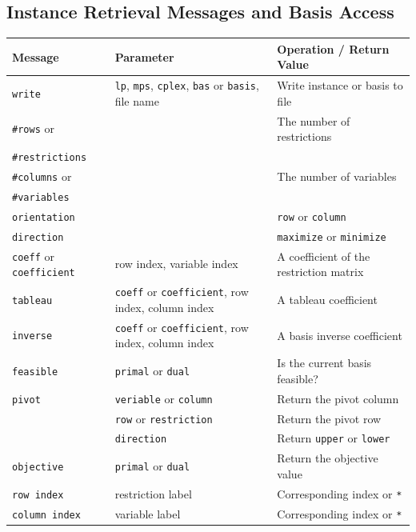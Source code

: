 \documentclass[a4paper,11pt,twoside]{book}
\begin{document}
\subsection{Instance Retrieval Messages and Basis Access}
\medskip
\begin{center}
\begin{tabular}{|p{3cm}|p{9cm}|p{12.5cm}|}
\hline
{\bf Message}       & {\bf Parameter} & {\bf Operation / Return Value} \\
\hline
\hline
\verb/write/        & \verb/lp/, \verb/mps/, \verb/cplex/,
                      \verb/bas/ or \verb/basis/, file name
                    & Write instance or basis to file \\
\hline
\verb/#rows/ or     & & The number of restrictions \\
\verb/#restrictions/& & \\
\hline
\verb/#columns/ or  & & The number of variables \\
\verb/#variables/   & & \\
\hline
\verb/orientation/  & & \verb/row/ or \verb/column/\\
\hline
\verb/direction/    & & \verb/maximize/ or \verb/minimize/\\
\hline
\verb/coeff/ or \verb/coefficient/
                    & row index, variable index
                    & A coefficient of the restriction matrix \\
\hline
\verb/tableau/      & \verb/coeff/ or \verb/coefficient/,
                      row index, column index
                    & A tableau coefficient \\
\hline
\verb/inverse/      & \verb/coeff/ or \verb/coefficient/,
                      row index, column index
                    & A basis inverse coefficient \\
\hline
\verb/feasible/     & \verb/primal/ or \verb/dual/
                    & Is the current basis feasible? \\
\hline
\verb/pivot/        & \verb/veriable/ or \verb/column/
                    & Return the pivot column \\
\hline
                    & \verb/row/ or \verb/restriction/
                    & Return the pivot row \\
\hline
                    & \verb/direction/
                    & Return \verb/upper/ or \verb/lower/ \\
\hline
\verb/objective/    & \verb/primal/ or \verb/dual/
                    & Return the objective value \\
\hline
\verb/row index/    & restriction label
                    & Corresponding index or \verb/*/ \\
\hline
\verb/column index/ & variable label
                    & Corresponding index or \verb/*/ \\
\hline
\end{tabular}
\end{center}
\end{document}
